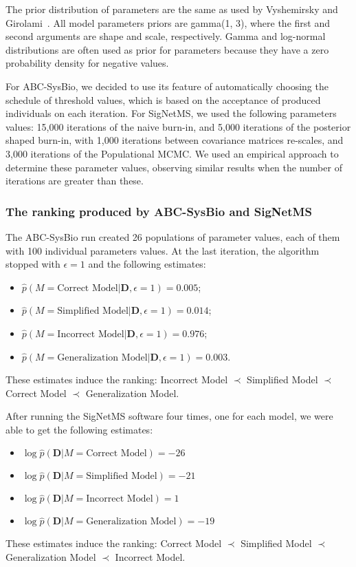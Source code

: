 The prior distribution of parameters are the same as used by Vyshemirsky
and Girolami~\cite{Vyshemirsky2007}. All model parameters priors are
gamma(1, 3), where the first and second arguments are shape and scale,
respectively. Gamma and log-normal distributions are often used as prior 
for parameters because they have a zero probability density for negative
values.

For ABC-SysBio, we decided to use its feature of automatically choosing
the schedule of threshold values, which is based on the acceptance of
produced individuals on each iteration. For SigNetMS, we used the
following parameters values: 15,000 iterations of the naive burn-in, and
5,000 iterations of the posterior shaped burn-in, with 1,000 iterations
between covariance matrices re-scales, and 3,000 iterations of the
Populational MCMC. We used an empirical approach to determine these
parameter values, observing similar results when the number of
iterations are greater than these.

\subsubsection{The ranking produced by ABC-SysBio and SigNetMS}
The ABC-SysBio run created 26 populations of parameter values, each of 
them with 100 individual parameters values. At the last iteration, the 
algorithm stopped with $\epsilon = 1$ and the following estimates: 
\begin{itemize}
    \item{$\hat{p} (M = \text{Correct Model} | {\bm D}, \epsilon = 1) =
        0.005$;}
    \item{$\hat{p} (M = \text{Simplified Model} | {\bm D}, \epsilon = 1)
        = 0.014$;} 
    \item{$\hat{p} (M = \text{Incorrect Model} | {\bm D}, \epsilon = 1)
        = 0.976$;}
    \item{$\hat{p} (M = \text{Generalization Model} | {\bm D}, \epsilon
        = 1) = 0.003$.}
\end{itemize}
These estimates induce the ranking: Incorrect Model $\prec$ Simplified 
Model $\prec$ Correct Model $\prec$ Generalization Model.

After running the SigNetMS software four times, one for each model, we
were able to get the following estimates:
\begin{itemize}
    \item{$\log \hat{p}({\bm D} | M = \text{Correct Model}) = -26$}
    \item{$\log \hat{p}({\bm D} | M = \text{Simplified Model}) = -21$}
    \item{$\log \hat{p}({\bm D} | M = \text{Incorrect Model}) = 1$}
    \item{$\log \hat{p}({\bm D} | M = \text{Generalization Model}) =
        -19$}
\end{itemize}
These estimates induce the ranking: Correct Model $\prec$ Simplified
Model $\prec$ Generalization Model $\prec$ Incorrect Model.

